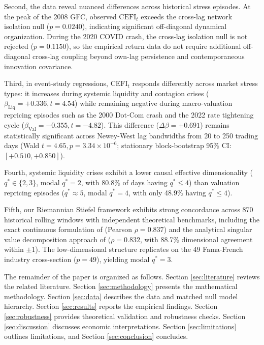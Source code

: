 \documentclass[review,12pt,authoryear]{elsarticle}
\begin{document}
Second, the data reveal nuanced differences across historical stress episodes. At the peak of the 2008 GFC, observed $\mathrm{CEFI}_t$ exceeds the cross-lag network isolation null ($p = 0.0240$), indicating significant off-diagonal dynamical organization. During the 2020 COVID crash, the cross-lag isolation null is not rejected ($p = 0.1150$), so the empirical return data do not require additional off-diagonal cross-lag coupling beyond own-lag persistence and contemporaneous innovation covariance.

Third, in event-study regressions, $\mathrm{CEFI}_t$ responds differently across market stress types: it increases during systemic liquidity and contagion crises ($\beta_{\mathrm{Liq}} = +0.336, t = 4.54$) while remaining negative during macro-valuation repricing episodes such as the 2000 Dot-Com crash and the 2022 rate tightening cycle ($\beta_{\mathrm{Val}} = -0.355, t = -4.82$). This difference ($\Delta \beta = +0.691$) remains statistically significant across Newey-West lag bandwidths from 20 to 250 trading days (Wald $t = 4.65, p = 3.34 \times 10^{-6}$; stationary block-bootstrap 95\% CI: $[+0.510, +0.850]$).

Fourth, systemic liquidity crises exhibit a lower causal effective dimensionality ($q^* \in \{2, 3\}$, modal $q^* = 2$, with 80.8\% of days having $q^* \le 4$) than valuation repricing episodes ($q^* \approx 5$, modal $q^* = 4$, with only 48.9\% having $q^* \le 4$).

Fifth, our Riemannian Stiefel framework exhibits strong concordance across 870 historical rolling windows with independent theoretical benchmarks, including the exact continuous formulation of \citet{liu2024exact} (Pearson $\rho = 0.837$) and the analytical singular value decomposition approach of \citet{liu2025singular} ($\rho = 0.832$, with 88.7\% dimensional agreement within $\pm 1$). The low-dimensional structure replicates on the 49 Fama-French industry cross-section ($p=49$), yielding modal $q^* = 3$.

The remainder of the paper is organized as follows. Section \ref{sec:literature} reviews the related literature. Section \ref{sec:methodology} presents the mathematical methodology. Section \ref{sec:data} describes the data and matched null model hierarchy. Section \ref{sec:results} reports the empirical findings. Section \ref{sec:robustness} provides theoretical validation and robustness checks. Section \ref{sec:discussion} discusses economic interpretations. Section \ref{sec:limitations} outlines limitations, and Section \ref{sec:conclusion} concludes.
\end{document}
